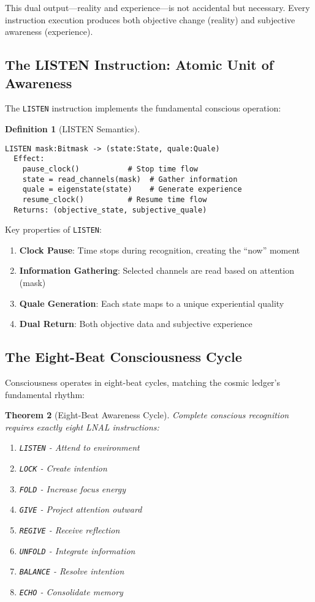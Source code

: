 \documentclass[12pt,a4paper]{article}
\newtheorem{theorem}{Theorem}[section]
\newtheorem{definition}[theorem]{Definition}
\newcommand{\opcmd}[1]{\texttt{#1}}
\begin{document}
This dual output—reality and experience—is not accidental but necessary. Every instruction execution produces both objective change (reality) and subjective awareness (experience).

\subsection{The LISTEN Instruction: Atomic Unit of Awareness}

The \opcmd{LISTEN} instruction implements the fundamental conscious operation:

\begin{definition}[LISTEN Semantics]
\begin{lstlisting}
LISTEN mask:Bitmask -> (state:State, quale:Quale)
  Effect: 
    pause_clock()           # Stop time flow
    state = read_channels(mask)  # Gather information
    quale = eigenstate(state)    # Generate experience
    resume_clock()          # Resume time flow
  Returns: (objective_state, subjective_quale)
\end{lstlisting}
\end{definition}

Key properties of \opcmd{LISTEN}:
\begin{enumerate}
\item \textbf{Clock Pause}: Time stops during recognition, creating the ``now'' moment
\item \textbf{Information Gathering}: Selected channels are read based on attention (mask)
\item \textbf{Quale Generation}: Each state maps to a unique experiential quality
\item \textbf{Dual Return}: Both objective data and subjective experience
\end{enumerate}

\subsection{The Eight-Beat Consciousness Cycle}

Consciousness operates in eight-beat cycles, matching the cosmic ledger's fundamental rhythm:

\begin{theorem}[Eight-Beat Awareness Cycle]
Complete conscious recognition requires exactly eight LNAL instructions:
\begin{enumerate}
\item \opcmd{LISTEN} - Attend to environment
\item \opcmd{LOCK} - Create intention 
\item \opcmd{FOLD} - Increase focus energy
\item \opcmd{GIVE} - Project attention outward
\item \opcmd{REGIVE} - Receive reflection
\item \opcmd{UNFOLD} - Integrate information
\item \opcmd{BALANCE} - Resolve intention
\item \opcmd{ECHO} - Consolidate memory
\end{enumerate}
\end{theorem}
\end{document}
